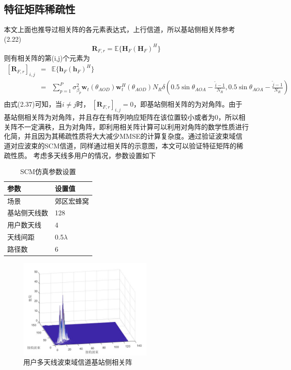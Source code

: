 \documentclass[bachelor,nocolorlinks, printoneside]{seuthesis} %
\begin{document}
\begin{Main}
\subsection{特征矩阵稀疏性}
本文上面也推导过相关阵的各元素表达式，上行信道，所以基站侧相关阵参考(2.22)
\begin{equation}\label{key}
\mathbf{R}_{F,r} = \mathbb{E} \lbrace \mathbf{H}_{F} (\mathbf{H}_{F})^{H} \rbrace
\end{equation}
则有相关阵的第(i,j)个元素为
\begin{eqnarray}\label{key}
[ \mathbf{R}_{F,r} ]_{i,j} & = &\mathbb{E} \lbrace \mathbf{h}_{F} (\mathbf{h}_{F})^{H} \rbrace  \nonumber \\
& = & \sum_{p=1}^{P} \sigma_{\beta_p}^{2} \mathbf{w}_{t}(\theta_{AOD}) \mathbf{w}_{t}^{H}(\theta_{AOD}) N_R \delta \left( 0.5\sin \theta_{AOA} - \frac{\tilde{i}-1}{N_R} , 0.5\sin \theta_{AOA} - \frac{\tilde{j}-1}{N_R} \right) \nonumber \\
\end{eqnarray}
由式(2.37)可知，当$ i \neq j$时， $ [ \mathbf{R}_{F,r} ]_{i,j} = 0$，即基站侧相关阵的为对角阵。由于基站侧相关阵为对角阵，并且存在有阵列响应矩阵在该位置较小或者为0，所以相关阵不一定满秩，且为对角阵，即利用相关阵计算可以利用对角阵的数学性质进行化简，并且因为其稀疏性质将大大减少MMSE的计算复杂度。通过验证波束域信道对应波束的SCM信道，同样通过相关阵的示意图，本文可以验证特征矩阵的稀疏性质。
考虑多天线多用户的情况，参数设置如下
\begin{table}[htbp]
	\centering
	\caption{\label{tab:test}SCM仿真参数设置}
	\begin{tabular}{ll}
		\toprule
		参数 &  设置值 \\
		\bottomrule
		场景 &  郊区宏蜂窝 \\
		\bottomrule
		基站侧天线数 & 128 \\
		\bottomrule
		用户数天线	& 4 \\
		\bottomrule
		天线间距 & 0.5$\lambda$ \\
		\bottomrule
		路径数 & 6 \\
		\bottomrule
	\end{tabular}
\end{table}
\begin{figure}[htbp!]
	\centering \includegraphics[width=0.6\textwidth]{img/2_4.jpg} \caption{用户多天线波束域信道基站侧相关阵}
\end{figure}


\end{Main}
\end{document}
